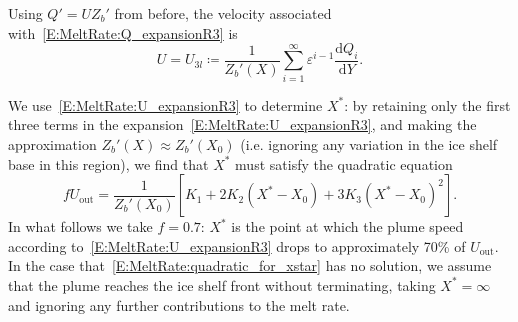 \documentclass[openacc]{rsproca_new}%
\newcommand{\dd}[2]{\frac{\mathrm{d} #1}{\mathrm{d} #2}}
\newcommand{\Pt}{\textit{P}_T}
\renewcommand{\in}{\text{in}} %
\newcommand{\out}{\text{out}}
\begin{document}

Using $Q' = U Z_b'$ from before, the velocity associated with~\eqref{E:MeltRate:Q_expansionR3} is
 \begin{equation}\label{E:MeltRate:U_expansionR3}
U = U_{3l} \coloneqq \frac{1}{Z_b'(X)} \sum_{i = 1}^{\infty} \varepsilon^{i-1} \dd{Q_i}{Y}.
\end{equation}

We use~\eqref{E:MeltRate:U_expansionR3} to determine $X^*$: by retaining only the first three terms in the expansion~\eqref{E:MeltRate:U_expansionR3}, and making the approximation  $Z_b'(X) \approx Z_b'(X_0)$ (i.e. ignoring any variation in the ice shelf base in this region), we find that $X^*$ must satisfy the quadratic equation
\begin{equation}\label{E:MeltRate:quadratic_for_xstar}
f U_\out = \frac{1}{Z_b'(X_0)}\left[K_1 + 2 K_2(X^* - X_0) + 3K_3(X^* - X_0)^2 \right].
\end{equation}
In what follows we take $f = 0.7$: $X^*$ is the point at which the plume speed according to~\eqref{E:MeltRate:U_expansionR3} drops to approximately 70\% of $U_\out$. In the case that~\eqref{E:MeltRate:quadratic_for_xstar} has no solution, we assume that the plume reaches the ice shelf front without terminating, taking $X^* = \infty$ and ignoring any further contributions to the melt rate.
\end{document}

